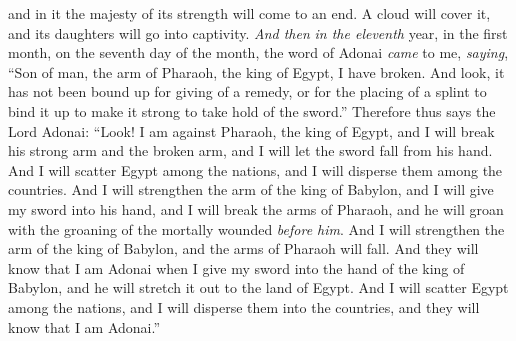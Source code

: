 \begin{biblechapter}
and in it the majesty of its strength 
will come to an end. 
A cloud will cover it, 
and its daughters will go into captivity.
\verse \textit{And then} \textit{in the eleventh} year, in the first month, on the seventh day of the month, the word of Adonai \textit{came} to me, \textit{saying},
\verse “Son of man, the arm of Pharaoh, the king of Egypt, I have broken. And look, it has not been bound up for giving of a remedy, or for the placing of a splint to bind it up to make it strong to take hold of the sword.”
\verse Therefore thus says the Lord Adonai: “Look! I am against Pharaoh, the king of Egypt, and I will break his strong arm and the broken arm, and I will let the sword fall from his hand.
\verse And I will scatter Egypt among the nations, and I will disperse them among the countries.
\verse And I will strengthen the arm of the king of Babylon, and I will give my sword into his hand, and I will break the arms of Pharaoh, and he will groan with the groaning of the mortally wounded \textit{before him}.
\verse And I will strengthen the arm of the king of Babylon, and the arms of Pharaoh will fall. And they will know that I am Adonai when I give my sword into the hand of the king of Babylon, and he will stretch it out to the land of Egypt.
\verse And I will scatter Egypt among the nations, and I will disperse them into the countries, and they will know that I am Adonai.”
\end{biblechapter}

